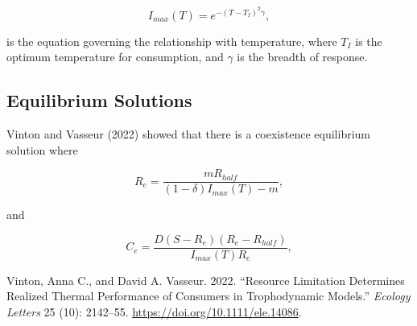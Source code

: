 \documentclass[
  letterpaper,
  DIV=11,
  numbers=noendperiod]{scrartcl}
\newlength{\cslhangindent}
\newenvironment{CSLReferences}[2] %
 {\begin{list}{}{%
  \setlength{\itemindent}{0pt}
  \setlength{\leftmargin}{0pt}
  \setlength{\parsep}{0pt}
  \ifodd #1
   \setlength{\leftmargin}{\cslhangindent}
   \setlength{\itemindent}{-1\cslhangindent}
  \fi
  \setlength{\itemsep}{#2\baselineskip}}}
 {\end{list}}
\begin{document}
\begin{equation}
\label{eq:i-max}
I_{max}(T) = e^{-(T-T_I)^2\gamma},
\end{equation}

is the equation governing the relationship with temperature, where
\(T_I\) is the optimum temperature for consumption, and \(\gamma\) is
the breadth of response.

\subsection{Equilibrium Solutions}\label{equilibrium-solutions}

Vinton and Vasseur (2022) showed that there is a coexistence equilibrium
solution where

\begin{equation}
\label{eq:r-equil}
R_e = \frac{m R_{half}}{(1-\delta)I_{max}(T) - m},
\end{equation}

and

\begin{equation}
\label{eq:c-equil}
C_e = \frac{D(S-R_e)(R_e - R_{half})}{I_{max}(T)R_e},
\end{equation}

\label{refs}
\begin{CSLReferences}{1}{0}
Vinton, Anna C., and David A. Vasseur. 2022. {``Resource Limitation
Determines Realized Thermal Performance of Consumers in Trophodynamic
Models.''} \emph{Ecology Letters} 25 (10): 2142--55.
\url{https://doi.org/10.1111/ele.14086}.

\end{CSLReferences}
\end{document}
